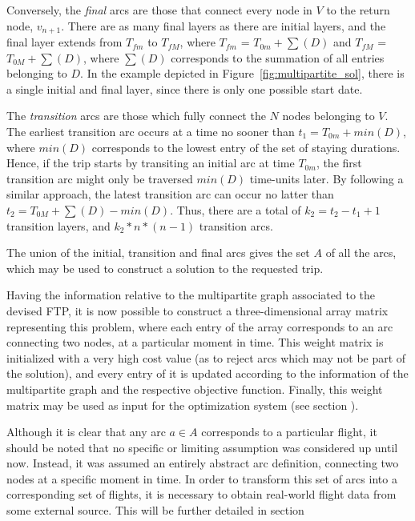 Conversely, the \textit{final} arcs are those that connect every node in $V$ to
the return node, $v_{n+1}$. There are as many final layers as there are initial
layers, and the final layer extends from $T_{fm}$ to $T_{fM}$, where $T_{fm}$ =
$T_{0m} + \sum(D)$ and $T_{fM}$ = $T_{0M} + \sum(D)$, where $\sum(D)$
corresponds to the summation of all entries belonging to $D$. In the example
depicted in Figure~\ref{fig:multipartite_sol}, there is a single initial and
final layer, since there is only one possible start date.

The \textit{transition} arcs are those which fully connect the $N$ nodes
belonging to $V$. The earliest transition arc occurs at a time no sooner than
$t_1 = T_{0m} + min(D)$, where $min(D)$ corresponds to the lowest entry of the
set of staying durations. Hence, if the trip starts by transiting an initial arc
at time $T_{0m}$, the first transition arc might only be traversed $min(D)$
time-units later. By following a similar approach, the latest transition arc can
occur no latter than $t_2 = T_{0M} + \sum(D) - min(D)$. Thus, there are a total
of $k_2 = t_2-t_1+1$ transition layers, and $k_2*n*(n-1)$ transition arcs.

The union of the initial, transition and final arcs gives the set $A$ of all the
arcs, which may be used to construct a solution to the requested trip. 

Having the information relative to the multipartite graph associated to the
devised FTP, it is now possible to construct a three-dimensional array matrix
representing this problem, where each entry of the array corresponds to an arc
connecting two nodes, at a particular moment in time. This weight matrix is
initialized with a very high cost value (as to reject arcs which may not be part
of the solution), and every entry of it is updated according to the information
of the multipartite graph and the respective objective function. Finally, this
weight matrix may be used as input for the optimization system (see
section
).

Although it is clear that any arc $a \in A$ corresponds to a particular flight,
it should be noted that no specific or limiting assumption was considered up
until now. Instead, it was assumed an entirely abstract arc definition,
connecting two nodes at a specific moment in time. In order to transform this
set of arcs into a corresponding set of flights, it is necessary to obtain
real-world flight data from some external source. This will be further detailed
in section







